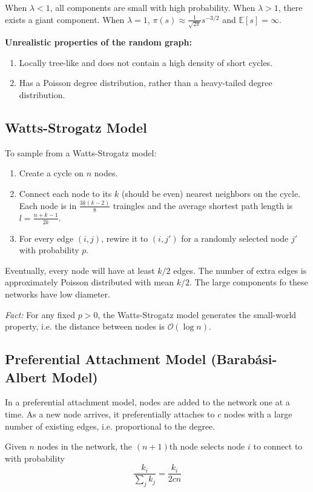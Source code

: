 \documentclass[12pt]{article}
\begin{document}
When $\lambda < 1$, all components are small with high probability. When $\lambda > 1$, there exists a giant component. When $\lambda = 1$, $\pi(s) \approx \frac{1}{\sqrt{2\pi}}s^{-3/2}$ and $\mathbb{E}[s] = \infty$.

\textbf{Unrealistic properties of the random graph:}
\begin{enumerate}
    \item Locally tree-like and does not contain a high density of short cycles.
    \item Has a Poisson degree distribution, rather than a heavy-tailed degree distribution.
\end{enumerate}

\subsection{Watts-Strogatz Model}
To sample from a Watts-Strogatz model:
\begin{enumerate}
    \item Create a cycle on $n$ nodes.
    \item Connect each node to its $k$ (should be even) nearest neighbors on the cycle. Each node is in $\frac{3k(k-2)}{8}$ traingles and the average shortest path length is $l = \frac{n+k-1}{2k}$.
    \item For every edge $(i,j)$, rewire it to $(i, j')$ for a randomly selected node $j'$ with probability $p$.
\end{enumerate}

Eventually, every node will have at least $k/2$ edges. The number of extra edges is approximately Poisson distributed with mean $k/2$. The large components fo these networks have low diameter.

\textit{Fact:} For any fixed $p > 0$, the Watts-Strogatz model generates the small-world property, i.e. the distance between nodes is $\mathcal{O}(\log n)$.

\subsection{Preferential Attachment Model (Barabási-Albert Model)}
In a preferential attachment model, nodes are added to the network one at a time. As a new node arrives, it preferentially attaches to $c$ nodes with a large number of existing edges, i.e. proportional to the degree.

Given $n$ nodes in the network, the $(n+1)$th node selects node $i$ to connect to with probability $$\frac{k_i}{\sum_j k_j} = \frac{k_i}{2cn}$$
\end{document}
